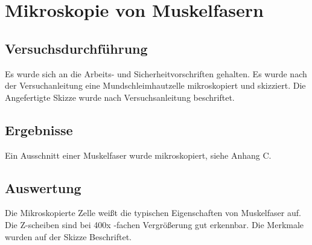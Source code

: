 \section{Mikroskopie von Muskelfasern}
\label{sec:Muskel}

\subsection{Versuchsdurchführung}
\label{sec:Muskel-V}

Es wurde sich an die Arbeits- und Sicherheitvorschriften gehalten.
Es wurde nach der Versuchanleitung eine Mundschleimhautzelle mikroskopiert und skizziert.
Die Angefertigte Skizze wurde nach Versuchsanleitung beschriftet.

\subsection{Ergebnisse}
\label{sec:Muskel-E}

Ein Ausschnitt einer Muskelfaser wurde mikroskopiert, siehe Anhang C.

\subsection{Auswertung}
\label{sec:Muskel-A}

Die Mikroskopierte Zelle weißt die typischen Eigenschaften von Muskelfaser auf.
Die Z-scheiben sind bei 400x -fachen Vergrößerung gut erkennbar.
Die Merkmale wurden auf der Skizze Beschriftet.
